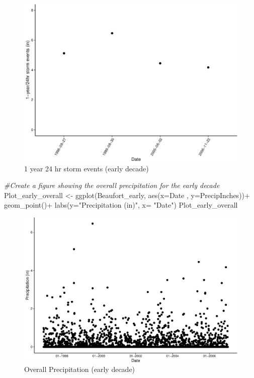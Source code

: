 \documentclass[
  12pt,
]{article}
\newenvironment{Shaded}{\begin{snugshade}}{\end{snugshade}}
\newcommand{\AttributeTok}[1]{\textcolor[rgb]{0.77,0.63,0.00}{#1}}
\newcommand{\CommentTok}[1]{\textcolor[rgb]{0.56,0.35,0.01}{\textit{#1}}}
\newcommand{\FunctionTok}[1]{\textcolor[rgb]{0.00,0.00,0.00}{#1}}
\newcommand{\NormalTok}[1]{#1}
\newcommand{\OtherTok}[1]{\textcolor[rgb]{0.56,0.35,0.01}{#1}}
\newcommand{\SpecialCharTok}[1]{\textcolor[rgb]{0.00,0.00,0.00}{#1}}
\newcommand{\StringTok}[1]{\textcolor[rgb]{0.31,0.60,0.02}{#1}}
\begin{document}
\begin{figure}
\centering
\includegraphics{Final_Project_Thornton_Katayama_Ngenzi_files/figure-latex/early plot 1-1.pdf}
\caption{1 year 24 hr storm events (early decade)}
\end{figure}

\begin{Shaded}
\begin{Highlighting}[]
\CommentTok{\#Create a figure showing the overall precipitation for the early decade}
\NormalTok{Plot\_early\_overall }\OtherTok{\textless{}{-}} \FunctionTok{ggplot}\NormalTok{(Beaufort\_early, }
                             \FunctionTok{aes}\NormalTok{(}\AttributeTok{x=}\NormalTok{Date , }\AttributeTok{y=}\NormalTok{PrecipInches))}\SpecialCharTok{+}
  \FunctionTok{geom\_point}\NormalTok{()}\SpecialCharTok{+}
  \FunctionTok{labs}\NormalTok{(}\AttributeTok{y=}\StringTok{"Precipitation (in)"}\NormalTok{, }\AttributeTok{x=} \StringTok{"Date"}\NormalTok{)}
\NormalTok{Plot\_early\_overall}
\end{Highlighting}
\end{Shaded}

\begin{figure}
\centering
\includegraphics{Final_Project_Thornton_Katayama_Ngenzi_files/figure-latex/early plot 2-1.pdf}
\caption{Overall Precipitation (early decade)}
\end{figure}
\end{document}
